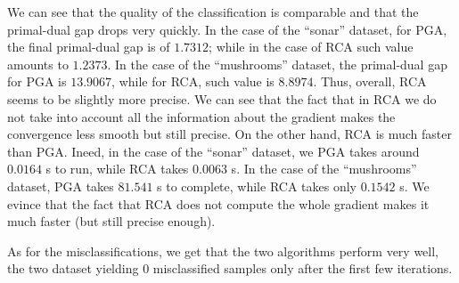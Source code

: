 \documentclass{article}
\begin{document}
\begin{itemize}
           We can see that the
           quality of the classification
           is comparable and that
           the primal-dual gap drops very quickly.
           In the case of the ``sonar'' dataset,
           for PGA, the final primal-dual gap is
           of $1.7312$; while in the case of
           RCA such value amounts to
           $1.2373$.
           In the case of the ``mushrooms''
           dataset, the primal-dual gap 
           for PGA is $13.9067$, while
           for RCA, such value is 
           $8.8974$. Thus, overall,
           RCA seems to be slightly more precise.
           We can see that the fact that 
           in RCA we do not take into account
           all the information about
           the gradient makes the convergence
           less smooth but still precise.
           On the other hand, RCA is much faster
           than PGA. Ineed, in the case
           of the ``sonar'' dataset,
           we PGA takes around $0.0164$ s to
           run, while RCA takes $0.0063$ s.
           In the case of the ``mushrooms''
           dataset, PGA takes $81.541$ s to 
           complete, while RCA takes only $0.1542$ s.
           We evince that the fact that
           RCA does not compute the whole
           gradient makes it much faster
           (but still precise enough).

           As for the misclassifications,
           we get that the two algorithms
           perform very well, the two
           dataset yielding $0$ misclassified
           samples only after the first few iterations.
           \newpage


\end{itemize}
\end{document}
